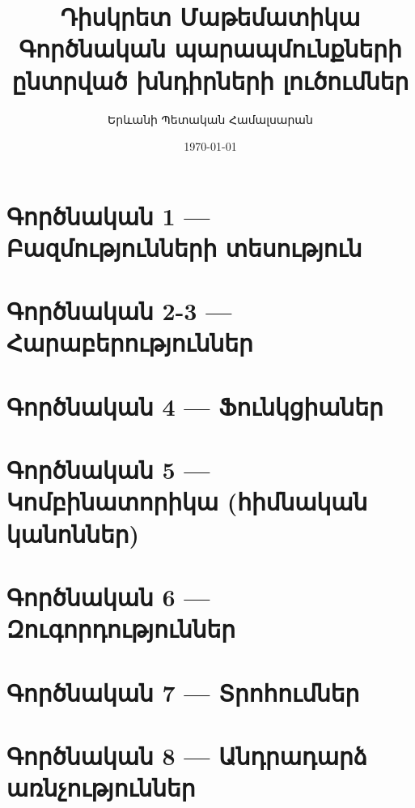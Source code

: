 \documentclass[12pt, a4paper]{article}
\title{\textbf{Դիսկրետ Մաթեմատիկա}\\[4pt]
       \large Գործնական պարապմունքների ընտրված խնդիրների լուծումներ}
\author{Երևանի Պետական Համալսարան}
\date{\today}
\let\oldmaketitle\maketitle
\renewcommand{\maketitle}{}
\let\oldtableofcontents\tableofcontents
\renewcommand{\tableofcontents}{}
\begin{document}
\oldmaketitle
\newpage

\oldtableofcontents
\newpage

\section{Գործնական 1 — Բազմությունների տեսություն}

\newpage

\section{Գործնական 2-3 — Հարաբերություններ}

\newpage

\section{Գործնական 4 — Ֆունկցիաներ}

\newpage

\section{Գործնական 5 — Կոմբինատորիկա (հիմնական կանոններ)}

\newpage

\section{Գործնական 6 — Զուգորդություններ}

\newpage

\section{Գործնական 7 — Տրոհումներ}

\newpage

\section{Գործնական 8 — Անդրադարձ առնչություններ}

\end{document}
